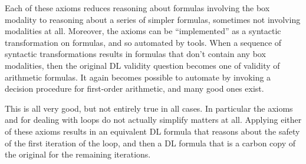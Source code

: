 \documentclass[11pt,twoside]{scrartcl}
\begin{document}
\begin{center}
  \begin{calculus}
{
  {}
}
{}%
{\linferenceRule[equiv]
  {(\ivr \land \ausfml)}
  {\axkey{\dbox{\passert{\ivr}}{\ausfml}}}
}{}%
{\linferenceRule[equiv]
  {(\ivr\limply\dbox{\ausprg}{\ausfml}) \land (\lnot\ivr\limply\dbox{\busprg}{\ausfml})}
  {\axkey{\dbox{\pif{\ivr}{\ausprg}{\busprg}}{\ausfml}}}
}{}%
{\linferenceRule[equiv]
  {\dbox{\ausprg}{\dbox{\busprg}{\ausfml}}}
  {\axkey{\dbox{\ausprg;\busprg}{\ausfml}}}
}{}%
{\linferenceRule[equiv]
  {\dbox{\pifs{\ivr}{\plgroup\ausprg;\pwhile{\ivr}{\ausprg}\prgroup}}{\ausfml}}
  {\axkey{\dbox{\pwhile{\ivr}{\ausprg}}{\ausfml}}}
}{}%
{\linferenceRule[equiv]
  {(\ivr\limply\dbox{\ausprg}{\dbox{\pwhile{\ivr}{\ausprg}}{\ausfml}}) \land (\lnot\ivr\limply\ausfml)}
  {\axkey{\dbox{\pwhile{\ivr}{\ausprg}}{\ausfml}}}
}{}%
  \end{calculus}
\end{center}

Each of these axioms reduces reasoning about formulas involving the box modality to reasoning about a series of simpler formulas, sometimes not involving modalities at all. Moreover, the axioms can be ``implemented'' as a syntactic transformation on formulas, and so automated by tools. When a sequence of syntactic transformations results in formulas that don't contain any box modalities, then the original DL validity question becomes one of validity of arithmetic formulas. It again becomes possible to automate by invoking a decision procedure for first-order arithmetic, and many good ones exist.

This is all very good, but not entirely true in all cases. In particular the axioms  and  for dealing with loops do not actually simplify matters at all. Applying either of these axioms results in an equivalent DL formula that reasons about the safety of the first iteration of the loop, and then a DL formula that is a carbon copy of the original for the remaining iterations.
\end{document}
